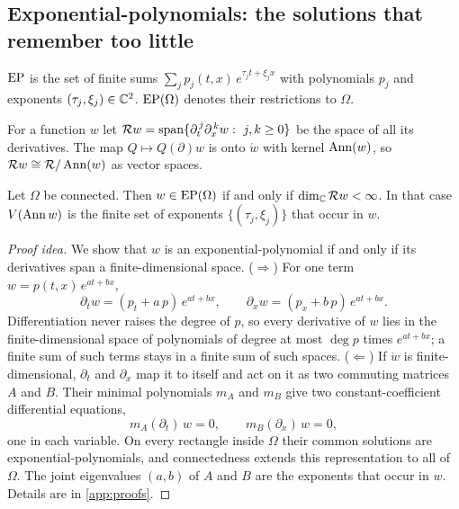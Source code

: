 \subsection{Exponential-polynomials: the solutions that remember too little}\label{sec:ep}
\begin{definition}\label{def:ep}
$\mathrm{EP}$ is the set of finite sums $\sum_{j}p_j(t,x)\,e^{\tau_jt+\xi_jx}$ with polynomials $p_j$ and
exponents $(\tau_j,\xi_j)\in\mathbb{C}^2$. $\mathrm{EP}(\Omega)$ denotes their restrictions to $\Omega$.
\end{definition}

For a function $w$ let $\mathcal{R} w=\operatorname{span}\{\partial_t^{\,j}\partial_x^{\,k}w:\ j,k\ge0\}$ be the space of all its
derivatives. The map $Q\mapsto Q(\partial)w$ is onto $\ring w$ with kernel $\operatorname{Ann}(w)$, so
$\mathcal{R} w\cong\mathcal{R}/\operatorname{Ann}(w)$ as vector spaces.

\begin{lemma}\label{lem:ep}
Let $\Omega$ be connected. Then $w\in\mathrm{EP}(\Omega)$ if and only if $\dim_{\mathbb{C}}\mathcal{R} w<\infty$. In that case
$V(\operatorname{Ann} w)$ is the finite set of exponents $\{(\tau_j,\xi_j)\}$ that occur in $w$.
\end{lemma}

\begin{proof}[Proof idea]
We show that $w$ is an exponential-polynomial if and only if its derivatives span a finite-dimensional
space. ($\Rightarrow$) For one term $w=p(t,x)\,e^{at+bx}$,
\[
  \partial_tw=(p_t+a\,p)\,e^{at+bx},\qquad \partial_xw=(p_x+b\,p)\,e^{at+bx}.
\]
Differentiation never raises the degree of $p$, so every derivative of $w$ lies in the finite-dimensional space
of polynomials of degree at most $\deg p$ times $e^{at+bx}$; a finite sum of such terms stays in a finite sum of
such spaces. ($\Leftarrow$) If $\ring w$ is finite-dimensional, $\partial_t$ and $\partial_x$ map it to itself and act
on it as two commuting matrices $A$ and $B$. Their minimal polynomials $m_A$ and $m_B$ give two
constant-coefficient differential equations,
\[
  m_A(\partial_t)\,w=0,\qquad m_B(\partial_x)\,w=0,
\]
one in each variable. On every rectangle inside $\Omega$ their common solutions are exponential-polynomials, and
connectedness extends this representation to all of $\Omega$. The joint eigenvalues $(a,b)$ of $A$ and $B$ are
the exponents that occur in $w$. Details are in \cref{app:proofs}.
\end{proof}


